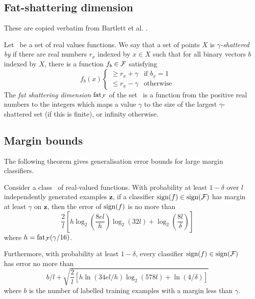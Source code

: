 \subsection{Fat-shattering dimension}
These are copied verbatim from Bartlett et al. \cite{Bartlett98a}.

Let \calF\ be a set of real values functions.  We say that a set of
points $X$ is \emph{$\gamma$-shattered by \calF} if there are real
numbers $r_x$ indexed by $x \in X$ such that for all binary vectors
$b$ indexed by $X$, there is a function $f_b \in \mathcal{F}$ satisfying
\begin{equation}
f_b(x)  \left\{
	\begin{array}{ll}
		\geq r_x + \gamma & \mbox{if $b_x = 1$} \\
		\leq r_x - \gamma & \mbox{otherwise}
	\end{array}
\right.
\end{equation}
The \emph{fat shattering dimension} $\mathrm{fat}_{\mathcal{F}}$ of the set \calF\ is
a function from the positive real numbers to the integers which maps a
value $\gamma$ to the size of the largest $\gamma$-shattered set (if
this is finite), or infinity otherwise.


\subsection{Margin bounds}
The following theorem gives generalisation error bounds for large
margin classifiers.

Consider a class \calF\ of real-valued functions.  With probability at
least $1 - \delta$ over $l$ independently generated examples
$\mathbf{z}$, if a classifier $\mathrm{sign} (f) \in \mathrm{sign} (\mathcal{F})$ has margin
at least $\gamma$ on $\mathbf{z}$, then the error of $\mathrm{sign} (f)$ is no
more than
\begin{equation}
\frac{2}{l} \left[ h \log_2 \left( \frac{8 e l}{h} \right) \log_2(32l)
+ \log_2 \left( \frac{8l}{\delta} \right) \right]
\end{equation}
where $h = \mathrm{fat}_{\mathcal{F}}(\gamma / 16)$.

Furthermore, with probability at least $1 - \delta$, every classifier
$\mathrm{sign} (f) \in \mathrm{sign} (\mathcal{F})$ has error no more than
\begin{equation}
b/l + \sqrt{\frac{2}{l} \left[ h \ln(34el/h) \log_2(578l) +
\ln(4/\delta) \right] }
\end{equation}
where $b$ is the number of labelled training examples with a margin
less than $\gamma$.

